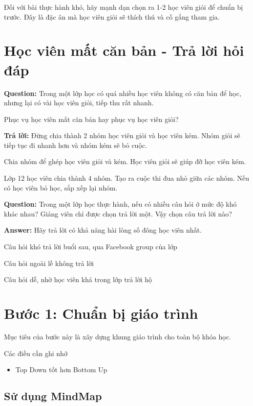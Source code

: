 Đối với bài thực hành khó, hãy mạnh dạn chọn ra 1-2 học viên giỏi để chuẩn bị trước. Đây là đặc ân mà học viên giỏi sẽ thích thú và cố gắng tham gia.

\section{Học viên mất căn bản - Trả lời hỏi đáp}

\textbf{Question:} Trong một lớp học có quá nhiều học viên không có căn bản để học, nhưng lại có vài học viên giỏi, tiếp thu rất nhanh.

Phục vụ học viên mất căn bản hay phục vụ học viên giỏi?

\textbf{Trả lời:} Đừng chia thành 2 nhóm học viên giỏi và học viên kém. Nhóm giỏi sẽ tiếp tục đi nhanh hơn và nhóm kém sẽ bỏ cuộc.

Chia nhóm để ghép học viên giỏi và kém. Học viên giỏi sẽ giúp đỡ học viên kém.

Lớp 12 học viên chia thành 4 nhóm. Tạo ra cuộc thi đua nhỏ giữa các nhóm. Nếu có học viên bỏ học, sắp xếp lại nhóm.

\textbf{Question:} Trong một lớp học thực hành, nếu có nhiều câu hỏi ở mức độ khó khác nhau? Giảng viên chỉ được chọn trả lời một. Vậy chọn câu trả lời nào?

\textbf{Answer:} Hãy trả lời có khả năng hài lòng số đông học viên nhất.

Câu hỏi khó trả lời buổi sau, qua Facebook group của lớp

Câu hỏi ngoài lề không trả lời

Câu hỏi dễ, nhờ học viên khá trong lớp trả lời hộ

\section{Bước 1: Chuẩn bị giáo trình}

Mục tiêu của bước này là xây dựng khung giáo trình cho toàn bộ khóa học.

Các điều cần ghi nhớ

\begin{itemize}
  \item Top Down tốt hơn Bottom Up
\end{itemize}


\subsection{Sử dụng MindMap}


